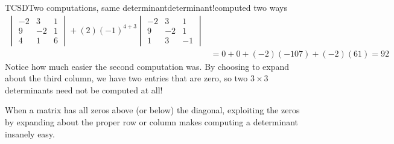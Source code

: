 \begin{example}{TCSD}{Two computations, same determinant}{determinant!computed two ways}
\begin{align*}
\begin{vmatrix}
-2 & 3 & 1\\
9 & -2 & 1\\
4 & 1 & 6
\end{vmatrix}
+
(2)(-1)^{4+3}
\begin{vmatrix}
-2 & 3 & 1\\
9 & -2 & 1\\
1 & 3 & -1
\end{vmatrix}\\
&=0+0+(-2)(-107)+(-2)(61)=92
\end{align*}
%
Notice how much easier the second computation was.  By choosing to expand about the third column, we have two entries that are zero, so two $3\times 3$ determinants need not be computed at all!
\end{example}
%
When a matrix has all zeros above (or below) the diagonal, exploiting the zeros by expanding about the proper row or column makes computing a determinant insanely easy.
%
